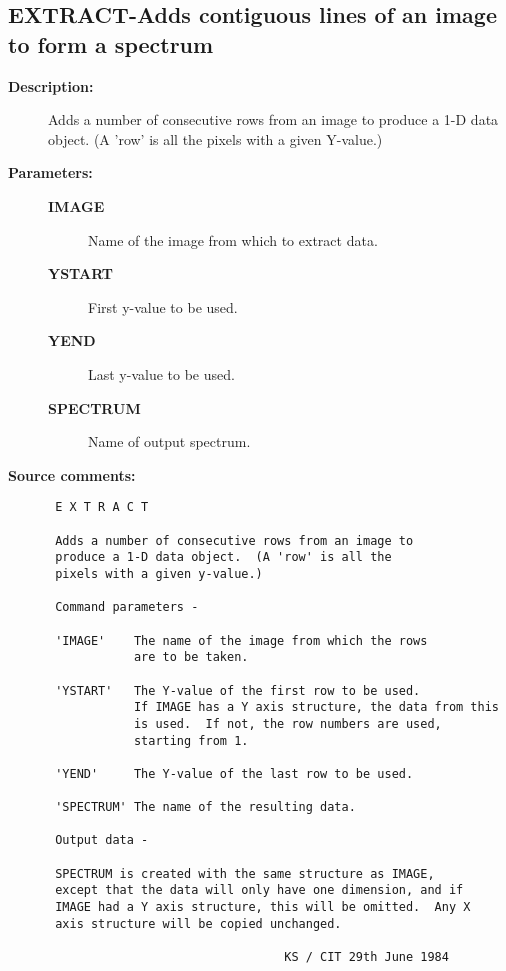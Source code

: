 \subsection{EXTRACT-\label{EXTRACT}Adds contiguous lines of an image to form a spectrum}
\begin{description}

\item [{\bf Description:}]
 Adds a number of consecutive rows from an image to produce a 1-D data
 object.  (A 'row' is all the pixels with a given Y-value.)

\item [{\bf Parameters:}]
\begin{description}
\item [{\bf IMAGE}]
 Name of the image from which to extract data.
\item [{\bf YSTART}]
 First y-value to be used.
\item [{\bf YEND}]
 Last y-value to be used.
\item [{\bf SPECTRUM}]
 Name of output spectrum.
\end{description}

\item [{\bf Source comments:}]
\begin{verbatim}
 E X T R A C T

 Adds a number of consecutive rows from an image to
 produce a 1-D data object.  (A 'row' is all the
 pixels with a given y-value.)

 Command parameters -

 'IMAGE'    The name of the image from which the rows
            are to be taken.

 'YSTART'   The Y-value of the first row to be used.
            If IMAGE has a Y axis structure, the data from this
            is used.  If not, the row numbers are used,
            starting from 1.

 'YEND'     The Y-value of the last row to be used.

 'SPECTRUM' The name of the resulting data.

 Output data -

 SPECTRUM is created with the same structure as IMAGE,
 except that the data will only have one dimension, and if
 IMAGE had a Y axis structure, this will be omitted.  Any X
 axis structure will be copied unchanged.

                                 KS / CIT 29th June 1984
\end{verbatim}
\end{description}
